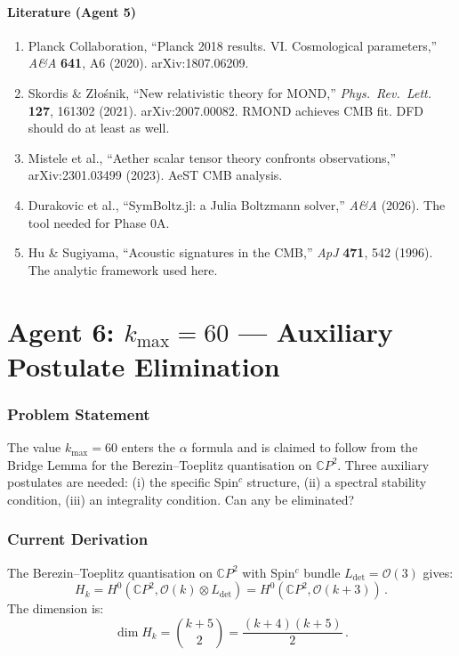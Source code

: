 \documentclass[11pt,a4paper]{article}
\newcommand{\CP}{\mathbb{C}P}
\begin{document}
\subsection{Literature (Agent 5)}

\begin{enumerate}
\item Planck Collaboration, ``Planck 2018 results. VI. Cosmological parameters,'' \textit{A\&A} \textbf{641}, A6 (2020). arXiv:1807.06209.
\item Skordis \& Z{\l}o\'snik, ``New relativistic theory for MOND,'' \textit{Phys.\ Rev.\ Lett.} \textbf{127}, 161302 (2021). arXiv:2007.00082. RMOND achieves CMB fit. DFD should do at least as well.
\item Mistele et al., ``Aether scalar tensor theory confronts observations,'' arXiv:2301.03499 (2023). AeST CMB analysis.
\item Durakovic et al., ``SymBoltz.jl: a Julia Boltzmann solver,'' \textit{A\&A} (2026). The tool needed for Phase 0A.
\item Hu \& Sugiyama, ``Acoustic signatures in the CMB,'' \textit{ApJ} \textbf{471}, 542 (1996). The analytic framework used here.
\end{enumerate}


\part{Agent 6: $k_{\max} = 60$ --- Auxiliary Postulate Elimination}
\label{part:kmax}

\section{Problem Statement}

The value $k_{\max} = 60$ enters the $\alpha$ formula and is claimed to follow from the Bridge Lemma for the Berezin--Toeplitz quantisation on $\CP^2$. Three auxiliary postulates are needed: (i) the specific Spin$^c$ structure, (ii) a spectral stability condition, (iii) an integrality condition. Can any be eliminated?

\section{Current Derivation}

The Berezin--Toeplitz quantisation on $\CP^2$ with Spin$^c$ bundle $L_{\det} = \mathcal{O}(3)$ gives:
\begin{equation}
H_k = H^0(\CP^2, \mathcal{O}(k) \otimes L_{\det}) = H^0(\CP^2, \mathcal{O}(k+3))\,.
\end{equation}
The dimension is:
\begin{equation}
\dim H_k = \binom{k+5}{2} = \frac{(k+4)(k+5)}{2}\,.
\end{equation}
\end{document}
